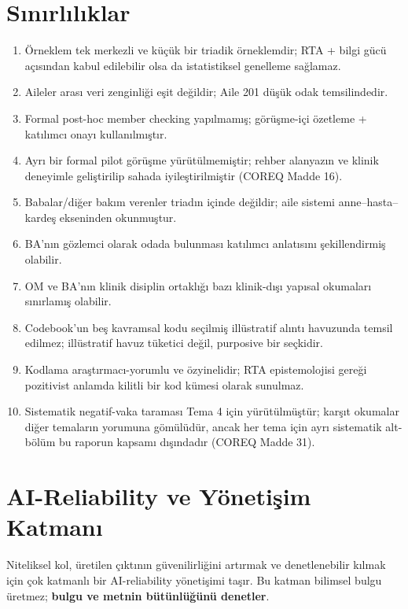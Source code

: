 \documentclass[
  turkish,
  a4paper,
  DIV=11,
  numbers=noendperiod]{scrreprt}
\providecommand{\tightlist}{%
  \setlength{\itemsep}{0pt}\setlength{\parskip}{0pt}}
\begin{document}
\chapter{Sınırlılıklar}\label{sec-sinirliliklar}

\begin{enumerate}
\def\labelenumi{\arabic{enumi}.}
\tightlist
\item
  Örneklem tek merkezli ve küçük bir triadik örneklemdir; RTA + bilgi
  gücü açısından kabul edilebilir olsa da istatistiksel genelleme
  sağlamaz.
\item
  Aileler arası veri zenginliği eşit değildir; Aile 201 düşük odak
  temsilindedir.
\item
  Formal post-hoc member checking yapılmamış; görüşme-içi özetleme +
  katılımcı onayı kullanılmıştır.
\item
  Ayrı bir formal pilot görüşme yürütülmemiştir; rehber alanyazın ve
  klinik deneyimle geliştirilip sahada iyileştirilmiştir (COREQ Madde
  16).
\item
  Babalar/diğer bakım verenler triadın içinde değildir; aile sistemi
  anne--hasta--kardeş ekseninden okunmuştur.
\item
  BA'nın gözlemci olarak odada bulunması katılımcı anlatısını
  şekillendirmiş olabilir.
\item
  OM ve BA'nın klinik disiplin ortaklığı bazı klinik-dışı yapısal
  okumaları sınırlamış olabilir.
\item
  Codebook'un beş kavramsal kodu seçilmiş illüstratif alıntı havuzunda
  temsil edilmez; illüstratif havuz tüketici değil, purposive bir
  seçkidir.
\item
  Kodlama araştırmacı-yorumlu ve özyinelidir; RTA epistemolojisi gereği
  pozitivist anlamda kilitli bir kod kümesi olarak sunulmaz.
\item
  Sistematik negatif-vaka taraması Tema 4 için yürütülmüştür; karşıt
  okumalar diğer temaların yorumuna gömülüdür, ancak her tema için ayrı
  sistematik alt-bölüm bu raporun kapsamı dışındadır (COREQ Madde 31).
\end{enumerate}

\chapter{AI-Reliability ve Yönetişim Katmanı}\label{sec-yonetisim}

Niteliksel kol, üretilen çıktının güvenilirliğini artırmak ve
denetlenebilir kılmak için çok katmanlı bir AI-reliability yönetişimi
taşır. Bu katman bilimsel bulgu üretmez; \textbf{bulgu ve metnin
bütünlüğünü denetler}.
\end{document}

